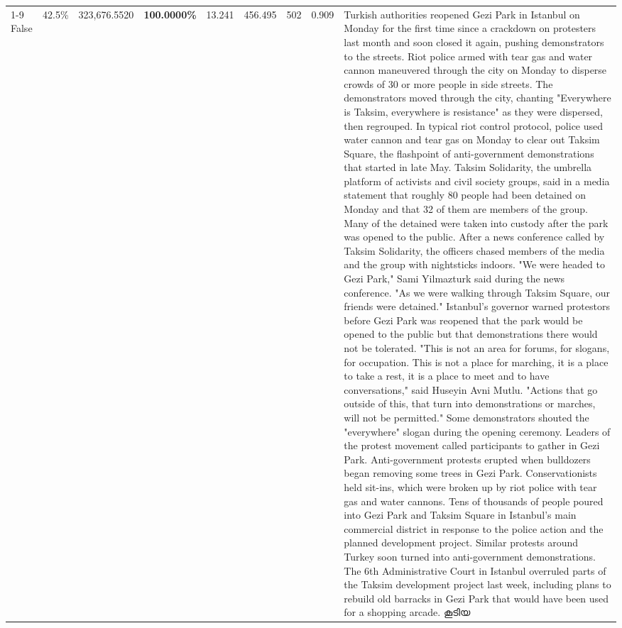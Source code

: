 \begin{table}[H]
\begin{tabular}{lllrlllll}
\cline{1-9}
False & 42.5\% & 323,676.5520 & \bfseries \color{red} 100.0000\% & 13.241 & 456.495 & 502 & 0.909 & Turkish authorities reopened Gezi Park in Istanbul on Monday for the first time since a crackdown on protesters last month and soon closed it again, pushing demonstrators to the streets. Riot police armed with tear gas and water cannon maneuvered through the city on Monday to disperse crowds of 30 or more people in side streets. The demonstrators moved through the city, chanting "Everywhere is Taksim, everywhere is resistance" as they were dispersed, then regrouped. In typical riot control protocol, police used water cannon and tear gas on Monday to clear out Taksim Square, the flashpoint of anti-government demonstrations that started in late May. Taksim Solidarity, the umbrella platform of activists and civil society groups, said in a media statement that roughly 80 people had been detained on Monday and that 32 of them are members of the group. Many of the detained were taken into custody after the park was opened to the public. After a news conference called by Taksim Solidarity, the officers chased members of the media and the group with nightsticks indoors. "We were headed to Gezi Park," Sami Yilmazturk said during the news conference. "As we were walking through Taksim Square, our friends were detained." Istanbul's governor warned protestors before Gezi Park was reopened that the park would be opened to the public but that demonstrations there would not be tolerated. "This is not an area for forums, for slogans, for occupation. This is not a place for marching, it is a place to take a rest, it is a place to meet and to have conversations," said Huseyin Avni Mutlu. "Actions that go outside of this, that turn into demonstrations or marches, will not be permitted." Some demonstrators shouted the "everywhere" slogan during the opening ceremony. Leaders of the protest movement called participants to gather in Gezi Park. Anti-government protests erupted when bulldozers began removing some trees in Gezi Park. Conservationists held sit-ins, which were broken up by riot police with tear gas and water cannons. Tens of thousands of people poured into Gezi Park and Taksim Square in Istanbul's main commercial district in response to the police action and the planned development project. Similar protests around Turkey soon turned into anti-government demonstrations. The 6th Administrative Court in Istanbul overruled parts of the Taksim development project last week, including plans to rebuild old barracks in Gezi Park that would have been used for a shopping arcade. കൂടിയ \\

\end{tabular}
\end{table}
